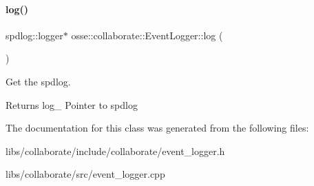 \paragraph{\texorpdfstring{log()}{log()}}
{\footnotesize\ttfamily spdlog\+::logger$\ast$ osse\+::collaborate\+::\+Event\+Logger\+::log (\begin{DoxyParamCaption}{ }\end{DoxyParamCaption})\hspace{0.3cm}{\ttfamily [inline]}}



Get the spdlog. 

\begin{DoxyReturn}{Returns}
log\+\_\+ Pointer to spdlog 
\end{DoxyReturn}


The documentation for this class was generated from the following files\+:\begin{DoxyCompactItemize}
\item 
libs/collaborate/include/collaborate/event\+\_\+logger.\+h\item 
libs/collaborate/src/event\+\_\+logger.\+cpp\end{DoxyCompactItemize}
